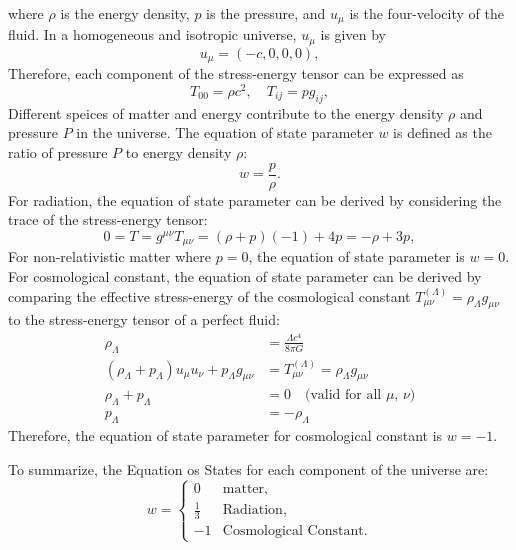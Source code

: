 where \( \rho \) is the energy density, \( p \) is the pressure, and \( u_{\mu} \) is the four-velocity of the fluid.
In a homogeneous and isotropic universe, \( u_{\mu} \) is given by
\begin{equation}
    u_{\mu} = (-c, 0, 0, 0),
    \label{eq:four_velocity}
\end{equation}
Therefore, each component of the stress-energy tensor can be expressed as
\begin{equation}
    T_{00} = \rho c^2, \quad T_{ij} = p g_{ij},
    \label{eq:stress_energy_components}
\end{equation}
Different speices of matter and energy contribute to the energy density \( \rho \) and pressure \( P \) in the universe. The equation of state parameter \( w \) is defined as the ratio of pressure \( P \) to energy density \( \rho \):
\begin{equation}
    w = \frac{p}{\rho}.
    \label{eq:equation_of_state}
\end{equation}
For radiation, the equation of state parameter can be derived by considering the trace of the stress-energy tensor:
\begin{equation}
    0 = T = g^{\mu\nu} T_{\mu\nu} = (\rho + p)(-1) + 4p = -\rho + 3p,
    \label{eq:stress_energy_trace}
\end{equation}
For non-relativistic matter where $p = 0$, the equation of state parameter is \( w = 0 \). 
For cosmological constant, the equation of state parameter can be derived by comparing the effective stress-energy of the cosmological constant $T_{\mu\nu}^{(\Lambda)} = \rho_{\Lambda} g_{\mu\nu}$ to the stress-energy tensor of a perfect fluid:
\begin{align}
    \rho_{\Lambda} &= \frac{\Lambda c^4}{8\pi G} \label{eq:lambda_density} \\
    \left(\rho_{\Lambda} + p_{\Lambda} \right) u_{\mu} u_{\nu} + p_{\Lambda} g_{\mu\nu} &= T_{\mu\nu}^{(\Lambda)} = \rho_{\Lambda} g_{\mu\nu}  \\
    \rho_{\Lambda} + p_{\Lambda} &= 0 \quad \text{(valid for all $\mu$, $\nu$)} \nonumber \\
    p_{\Lambda} &= -\rho_{\Lambda} \label{eq:lambda_pressure}
\end{align}
Therefore, the equation of state parameter for cosmological constant is \( w = -1 \).

To summarize, the Equation os States for each component of the universe are:
\begin{equation}
    w = 
    \begin{cases}
        0 & \text{matter}, \\
        \frac{1}{3} & \text{Radiation}, \\
        -1 & \text{Cosmological Constant}.
    \end{cases}
    \label{eq:equation_of_state_summary}
\end{equation}

